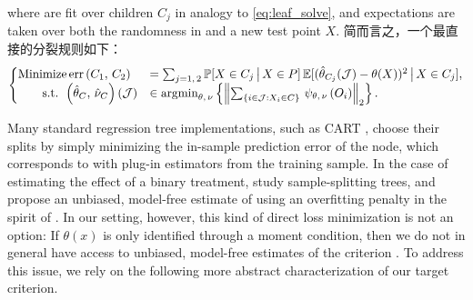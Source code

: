 \documentclass[aos]{imsart}
\theoremstyle{plain}
\theoremstyle{definition}
\theoremstyle{remark}
\begin{document}
\begin{CJK}{UTF8}{gbsn}
where  are fit over children $C_j$ in analogy to \eqref{eq:leaf_solve},
and expectations are taken over both the randomness in  and a
new test point $X$. 简而言之，一个最直接的分裂规则如下：
\begin{equation*}
    \begin{cases}
    \text{Minimize}  \err\p{C_1, \, C_2} &= \sum_{j = 1, \, 2}\mathbb{P}[X \in C_j \cond X \in P] \, \mathbb{E}[(\htheta_{C_j}(\mathcal{J}) - \theta(X))^2 \cond X \in C_j], \\
    \qquad \text{s.t. }   \p{\htheta_{C}, \, \hnu_{C}}(\mathcal{J}) &\in \argmin_{\theta, \, \nu} \cb{\Norm{\sum_{\cb{i\in\mathcal{J} : X_i \in C}} \, \psi_{\theta, \, \nu}\p{O_i}}_2}.
    \end{cases}
\end{equation*}



Many standard regression tree implementations, such as CART \citep{breiman1984classification},
choose their splits by simply minimizing the in-sample prediction error of the node, which corresponds to 
 with plug-in estimators from the training sample. 
In the case of estimating the effect of a binary treatment,
\citet{athey2016recursive} study sample-splitting trees, and
propose an unbiased, model-free estimate of   using
an overfitting penalty in the spirit of \citet{mallows1973some}.
In our setting, however, this kind of direct loss minimization is not an option: If $\theta(x)$ is only
identified through a moment condition, then we do not in general have access to unbiased,
model-free estimates of the criterion  . To address this issue, we
rely on the following more abstract characterization of our target criterion. 


\end{CJK}
\end{document}

